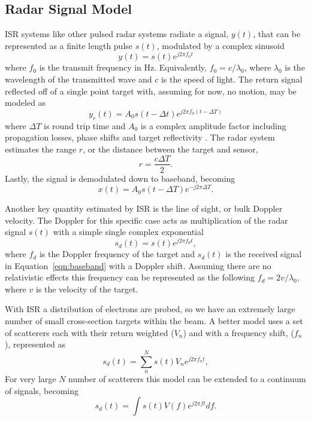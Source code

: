 \subsection{Radar Signal Model}
ISR systems like other pulsed radar systems radiate a signal, $y(t)$, that can be represented as a finite length pulse $s(t)$, modulated by a complex sinusoid
\begin{equation}
\label{eqn:sigone}
y(t)=s(t)e^{j2\pi f_0 t}
\end{equation}
where $f_0$ is the transmit frequency in Hz. Equivalently, $ f_0=c/\lambda_0$, where $\lambda_0$ is the wavelength of the transmitted wave and $c$ is the speed of light. The return signal reflected off of a single point target with, assuming for now, no motion, may be modeled as
\begin{equation}
\label{eqn:sigone}
y_r(t)=A_0s(t-\Delta t)e^{j2\pi f_0 (t-\Delta T)}
\end{equation}
where $\Delta T$ is round trip time and $A_0$ is a complex amplitude factor including propagation losses, phase shifts and target reflectivity \citep{richards2014fundamentals}. The radar system estimates the range $r$, or the distance between the target and sensor,
\begin{equation}
\label{eqn:range_intro}
r=\frac{c\Delta T}{2}.
\end{equation}
Lastly, the signal is demodulated down to baseband, becoming
\begin{equation}
\label{eqn:baseband}
x(t)=A_0s(t-\Delta T)e^{-j2\pi\Delta T}.
\end{equation}

Another key quantity estimated by ISR is the line of sight, or bulk Doppler velocity. The Doppler for this specific case acts as multiplication of the radar signal $s(t)$ with a simple single complex exponential
\begin{equation}
\label{simpledop}
s_d(t) = s(t)e^{j2\pi f_d t},
\end{equation}
 where $f_d$ is the Doppler frequency of the target and $s_d(t)$ is the received signal in Equation~\ref{eqn:baseband} with a Doppler shift. Assuming there are no relativistic effects this frequency can be represented as the following $f_d = 2v/\lambda_0 $, where $v$ is the velocity of the target. 

With ISR a distribution of electrons are probed, so we have an extremely large number of small cross-section targets within the beam. A better model uses a set of scatterers each with their return weighted ($V_n$) and with a frequency shift, ($f_n$), represented as
\begin{equation}
\label{multiDop}
\displaystyle s_d(t) = \sum_{n}^{N} s(t)V_ne^{j2\pi f_{n} t},
\end{equation}
For very large $N$ number of scatterers this model can be extended to a continuum of signals, becoming
\begin{equation}
\label{conDop}
s_d(t) = \int s(t) V(f)e^{j2\pi ft} df.
\end{equation}

